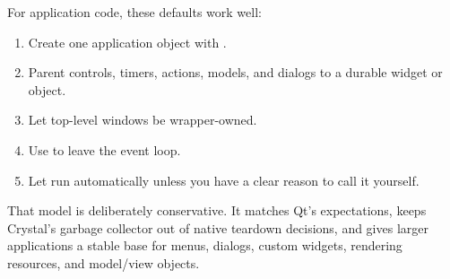 For application code, these defaults work well:

\begin{enumerate}
\item Create one application object with .
\item Parent controls, timers, actions, models, and dialogs to a durable widget or object.
\item Let top-level windows be wrapper-owned.
\item Use  to leave the event loop.
\item Let  run automatically unless you have a clear reason to call it yourself.
\end{enumerate}

That model is deliberately conservative. It matches Qt's expectations, keeps Crystal's garbage collector out of native teardown decisions, and gives larger applications a stable base for menus, dialogs, custom widgets, rendering resources, and model/view objects.
